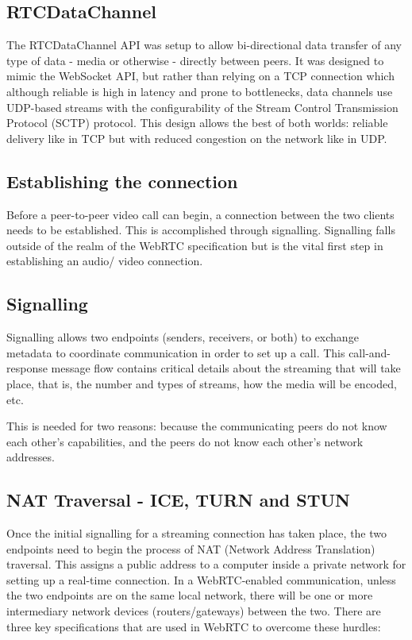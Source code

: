 \subsection{RTCDataChannel}

The RTCDataChannel API was setup to allow bi-directional data transfer of any 
type of data - media or otherwise - directly between peers. It was designed to mimic the 
WebSocket API, but rather than relying on a TCP connection which although reliable is high 
in latency and prone to bottlenecks, data channels use UDP-based streams with the configurability
 of the Stream Control Transmission Protocol (SCTP) protocol. This design allows the best 
 of both worlds: reliable delivery like in TCP but with reduced congestion on the network like in UDP.

\subsection{Establishing the connection}

 Before a peer-to-peer video call can begin, a connection between the two clients
  needs to be established. This is accomplished through signalling. Signalling falls
   outside of the realm of the WebRTC specification but is the vital first step in establishing 
   an audio/ video connection.

\subsection{Signalling}

   Signalling allows two endpoints (senders, receivers, or both) to exchange metadata to 
   coordinate communication in order to set up a call. This call-and-response message flow 
   contains critical details about the streaming that will take place, that is, the number 
   and types of streams, how the media will be encoded, etc. 

   This is needed for two reasons: because the communicating peers do not know each other’s capabilities,
   and the peers do not know each other’s network addresses.

   \subsection{NAT Traversal - ICE, TURN and STUN}

   Once the initial signalling for a streaming connection has taken place, the two endpoints need 
   to begin the process of NAT (Network Address Translation) traversal.
   This assigns a public address to a computer inside a private network for setting up a real-time connection. 
   In a WebRTC-enabled communication, unless the two endpoints are on the same local network, 
   there will be one or more intermediary network devices (routers/gateways) between the two. 
   There are three key specifications that are used in WebRTC to overcome these hurdles:

